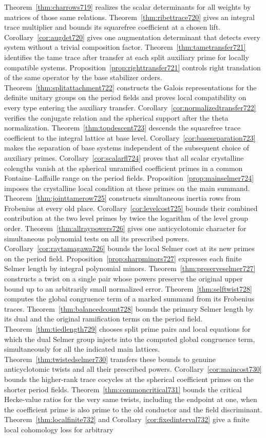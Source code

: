 \documentclass[a4paper,11pt]{article}
\theoremstyle{definition}
\theoremstyle{remark}
\numberwithin{equation}{section}
\begin{document}
Theorem~\ref{thm:charrows719} realizes the scalar determinants for all weights by matrices of those same relations. Theorem~\ref{thm:ribettrace720} gives an integral trace multiplier and bounds its squarefree coefficient at a chosen lift. Corollary~\ref{cor:augdet720} gives one augmentation determinant that detects every system without a trivial composition factor. Theorem~\ref{thm:tametransfer721} identifies the tame trace after transfer at each split auxiliary prime for locally compatible systems. Proposition~\ref{prop:righttransfer721} controls right translation of the same operator by the base stabilizer orders. Theorem~\ref{thm:splitattachment722} constructs the Galois representations for the definite unitary groups on the period fields and proves local compatibility on every type entering the auxiliary transfer. Corollary~\ref{cor:normalizedtransfer722} verifies the conjugate relation and the spherical support after the theta normalization. Theorem~\ref{thm:topdescent723} descends the squarefree trace coefficient to the integral lattice at base level. Corollary~\ref{cor:baseseparation723} makes the separation of base systems independent of the subsequent choice of auxiliary primes. Corollary~\ref{cor:scalarfl724} proves that all scalar crystalline colengths vanish at the spherical unramified coefficient primes in a common Fontaine--Laffaille range on the period fields. Proposition~\ref{prop:mainselmer724} imposes the crystalline local condition at these primes on the main summand. Theorem~\ref{thm:jointtamerow725} constructs simultaneous inertia rows from Frobenius at every old place. Corollary~\ref{cor:levelcost725} bounds their combined contribution at the two level primes by twice the logarithm of the level group order. Theorem~\ref{thm:allraypowers726} gives one anticyclotomic character for simultaneous polynomial tests on all its prescribed powers. Corollary~\ref{cor:raytamagawa726} bounds the local Selmer cost at its new primes on the period field. Proposition~\ref{prop:sharpminors727} expresses each finite Selmer length by integral polynomial minors. Theorem~\ref{thm:preserveselmer727} constructs a twist on a single pair whose powers preserve the original upper bound up to an arbitrarily small normalized error. Theorem~\ref{thm:selftwist728} computes the global congruence term of a marked summand from its Frobenius traces. Theorem~\ref{thm:balancedcount728} bounds the primary Selmer length by its dual and the original ramification terms on the period field. Theorem~\ref{thm:tiedlength729} chooses split prime pairs and local equations for which the dual Selmer group injects into the computed global congruence term, simultaneously for all the indicated main lattices. Theorem~\ref{thm:twistedselmer730} transfers these bounds to genuine anticyclotomic twists and all their prescribed powers. Corollary~\ref{cor:maincost730} bounds the higher-rank trace cocycles at the spherical coefficient primes on the shorter period fields. Theorem~\ref{thm:commoncritical731} bounds the critical Hecke-value ratios for the very same twists, including the endpoint at one, when the coefficient prime is also prime to the old conductor and the field discriminant. Theorem~\ref{thm:localfinite732} and Corollary~\ref{cor:fixedinterval732} give a finite local cohomology loss for arbitrary 
\end{document}

